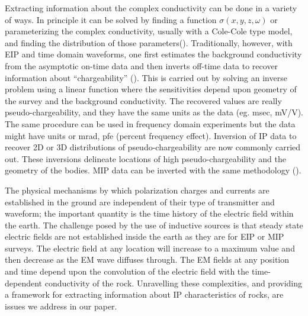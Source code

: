 \documentclass[a4paper, 11pt]{article}
\begin{document}
Extracting information about the complex conductivity can be done in a variety of ways. In principle it can be solved by finding a function $\sigma(x,y,z,\omega)$ or parameterizing the complex conductivity, usually with a Cole-Cole type model, and finding the distribution of those parameters(\cite{Yuval1997,Hordt2006}). Traditionally, however, with EIP and time domain waveforms, one first estimates the background conductivity from the asymptotic on-time data and then inverts off-time data to recover information about ``chargeability'' (\cite{doug1994}). This is carried out by solving an inverse problem using a linear function where the sensitivities depend upon geometry of the survey and the background conductivity. The recovered values are really pseudo-chargeability, and they have the same units as the data (eg. msec, mV/V). The same procedure can be used in frequency domain experiments but the data might have units or mrad, pfe (percent frequency effect). Inversion of IP data to recover 2D or 3D distributions of pseudo-chargeability are now commonly carried out. These inversions delineate locations of high pseudo-chargeability and the geometry of the bodies. MIP data can be inverted with the same methodology (\cite{Chen2003}). 

The physical mechanisms by which polarization charges and currents are established in the ground are independent of their type of transmitter and waveform; the important quantity is the time history of the electric field within the earth. The challenge posed by the use of  inductive sources is that steady state electric fields are not established inside the earth as they are for EIP or MIP surveys. The electric field at any location will increase to a maximum value and then decrease as the EM wave diffuses through. The EM fields at any position and time depend upon the convolution of the electric field with the time-dependent conductivity of the rock. Unravelling these complexities, and providing a framework for extracting information about IP characteristics of rocks, are issues we address in our paper. 
\end{document}
